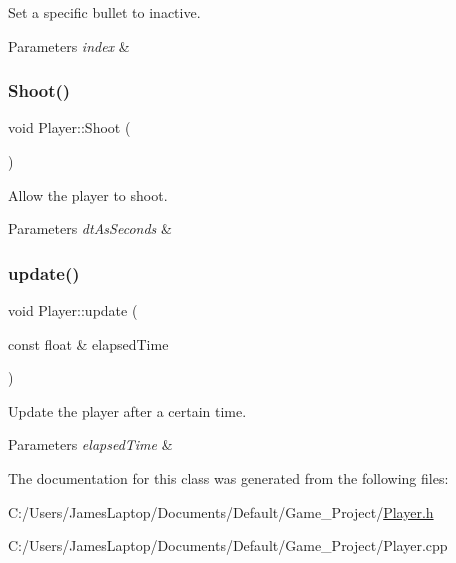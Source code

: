 Set a specific bullet to inactive. 


\begin{DoxyParams}{Parameters}
{\em index} & \\
\hline
\end{DoxyParams}
\mbox{\label{class_player_a2105394431517a41d38140cb65982331}} 
\subsubsection{\texorpdfstring{Shoot()}{Shoot()}}
{\footnotesize\ttfamily void Player\+::\+Shoot (\begin{DoxyParamCaption}{ }\end{DoxyParamCaption})}



Allow the player to shoot. 


\begin{DoxyParams}{Parameters}
{\em dt\+As\+Seconds} & \\
\hline
\end{DoxyParams}
\mbox{\label{class_player_aaccee569406f6180bd5028d058b8579f}} 
\subsubsection{\texorpdfstring{update()}{update()}}
{\footnotesize\ttfamily void Player\+::update (\begin{DoxyParamCaption}\item[{const float \&}]{elapsed\+Time }\end{DoxyParamCaption})}



Update the player after a certain time. 


\begin{DoxyParams}{Parameters}
{\em elapsed\+Time} & \\
\hline
\end{DoxyParams}


The documentation for this class was generated from the following files\+:\begin{DoxyCompactItemize}
\item 
C\+:/\+Users/\+James\+Laptop/\+Documents/\+Default/\+Game\+\_\+\+Project/\hyperlink{_player_8h}{Player.\+h}\item 
C\+:/\+Users/\+James\+Laptop/\+Documents/\+Default/\+Game\+\_\+\+Project/Player.\+cpp\end{DoxyCompactItemize}
